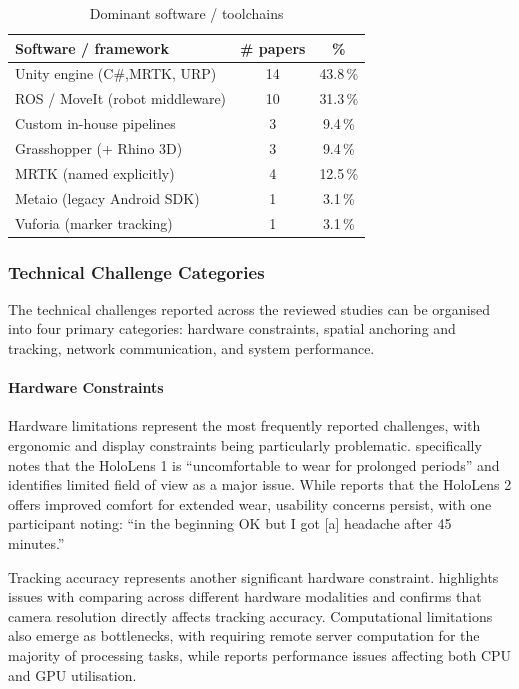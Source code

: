 \begin{table}[t!]
\centering
\caption{Dominant software / toolchains}
\label{tab:rq3-software}
\begin{tabular}{@{}lcc@{}}
\toprule
\textbf{Software / framework} & \textbf{\# papers} & \textbf{\%} \\ \midrule
Unity engine (C\#,\;MRTK, URP) & 14 & 43.8\,\% \\
ROS / MoveIt (robot middleware) &  10 & 31.3\,\% \\
Custom in-house pipelines       &  3 &  9.4\,\% \\
Grasshopper (+ Rhino 3D)        &  3 &  9.4\,\% \\
MRTK (named explicitly)         &  4 &  12.5\,\% \\
Metaio (legacy Android SDK)     &  1 &  3.1\,\% \\
Vuforia (marker tracking)       &  1 &  3.1\,\% \\ \bottomrule
\end{tabular}
\end{table}


\subsubsection{Technical Challenge Categories}

The technical challenges reported across the reviewed studies can be organised into four primary categories: hardware constraints, spatial anchoring and tracking, network communication, and system performance.

\paragraph{Hardware Constraints}

Hardware limitations represent the most frequently reported challenges, with ergonomic and display constraints being particularly problematic. \cite{cogurcu2023comparative} specifically notes that the HoloLens 1 is ``uncomfortable to wear for prolonged periods'' and identifies limited field of view as a major issue. While \cite{yang2023usability} reports that the HoloLens 2 offers improved comfort for extended wear, usability concerns persist, with one participant noting: ``in the beginning OK but I got [a] headache after 45 minutes.''

Tracking accuracy represents another significant hardware constraint. \cite{aschenbrenner2019comparing} highlights issues with comparing across different hardware modalities and confirms that camera resolution directly affects tracking accuracy. Computational limitations also emerge as bottlenecks, with \cite{stacchio2023annHoloTator} requiring remote server computation for the majority of processing tasks, while \cite{schmidt2022augmentedReality} reports performance issues affecting both CPU and GPU utilisation.

